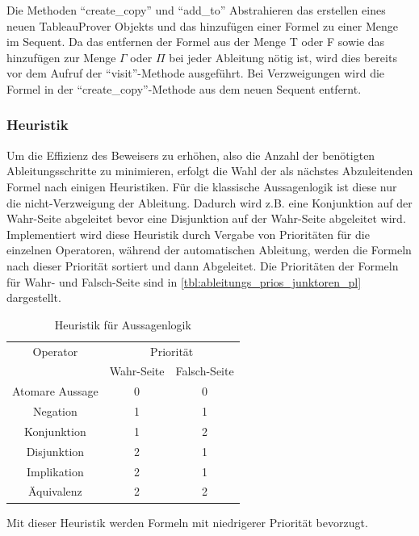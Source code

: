 Die Methoden ``create\_copy'' und ``add\_to'' Abstrahieren das erstellen eines neuen TableauProver Objekts und das hinzufügen einer Formel zu einer Menge im Sequent. Da das entfernen der Formel aus der Menge T oder F sowie das hinzufügen zur Menge $\Gamma$ oder $\Pi$ bei jeder Ableitung nötig ist, wird dies bereits vor dem Aufruf der ``visit''-Methode ausgeführt. Bei Verzweigungen wird die Formel in der ``create\_copy''-Methode aus dem neuen Sequent entfernt.

\subsubsection{\label{sec:heuristiken}Heuristik}
Um die Effizienz des Beweisers zu erhöhen, also die Anzahl der benötigten Ableitungsschritte zu minimieren, erfolgt die Wahl der als nächstes Abzuleitenden Formel nach einigen Heuristiken. Für die klassische Aussagenlogik ist diese nur die nicht-Verzweigung der Ableitung. Dadurch wird z.B. eine Konjunktion auf der Wahr-Seite abgeleitet bevor eine Disjunktion auf der Wahr-Seite abgeleitet wird. Implementiert wird diese Heuristik durch Vergabe von Prioritäten für die einzelnen Operatoren, während der automatischen Ableitung, werden die Formeln nach dieser Priorität sortiert und dann Abgeleitet. Die Prioritäten der Formeln für Wahr- und Falsch-Seite sind in \autoref{tbl:ableitungs_prios_junktoren_pl} dargestellt.

\begin{table}[h]
\begin{center}
\begin{tabular}{|c|c|c|}
\hline
Operator & \multicolumn{2}{c|}{Priorität} \\
\cline{2-3}
 & Wahr-Seite & Falsch-Seite \\
\hline
Atomare Aussage & 0 & 0 \\
Negation & 1 & 1 \\
Konjunktion & 1 & 2 \\
Disjunktion & 2 & 1 \\
Implikation & 2 & 1 \\
Äquivalenz & 2 & 2 \\
\hline
\end{tabular}
\end{center}
\caption{\label{tbl:ableitungs_prios_junktoren_pl}Heuristik für Aussagenlogik}
\end{table}

Mit dieser Heuristik werden Formeln mit niedrigerer Priorität bevorzugt.


